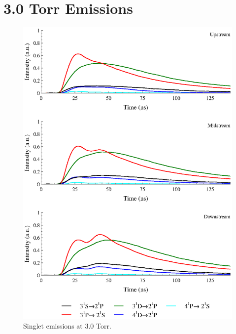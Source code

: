 \section{3.0 Torr Emissions}
\begin{figure}
  \centering
  \includegraphics{./chapters/extraem/figures/3torr_s.eps}
  \caption{Singlet emissions at 3.0 Torr.}
\end{figure}
